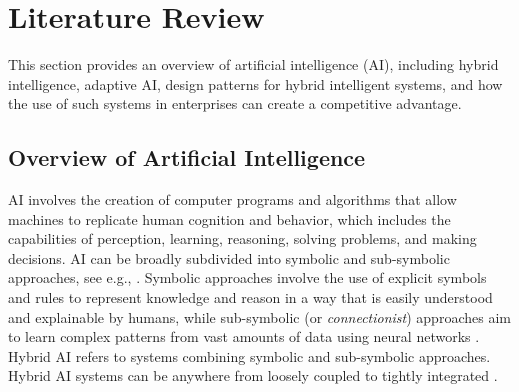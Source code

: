 \section{Literature Review}
\label{sec:literature}

This section provides an overview of artificial intelligence (AI), including hybrid intelligence, adaptive AI,
design patterns for hybrid intelligent systems, and how the use of such systems in enterprises can create a
competitive advantage.

\subsection{Overview of Artificial Intelligence}

AI involves the creation of computer programs and algorithms that allow machines to replicate human cognition and behavior,
which includes the capabilities of perception, learning, reasoning, solving problems, and making decisions. AI can be broadly
subdivided into symbolic and sub-symbolic approaches, see e.g., \cite{eliasmithSymbolicSubsymbolic2006}. Symbolic approaches
involve the use of explicit symbols and rules to represent knowledge and reason in a way that is easily understood and explainable
by humans, while sub-symbolic (or \textit{connectionist}) approaches aim to learn complex patterns from vast amounts of data
using neural networks \citep{ilkouSymbolicVsSubsymbolic2020}. Hybrid AI refers to systems combining symbolic and sub-symbolic
approaches. Hybrid AI systems can be anywhere from loosely coupled to tightly integrated \citep{garcezNeurosymbolicAI3rd2023}.

